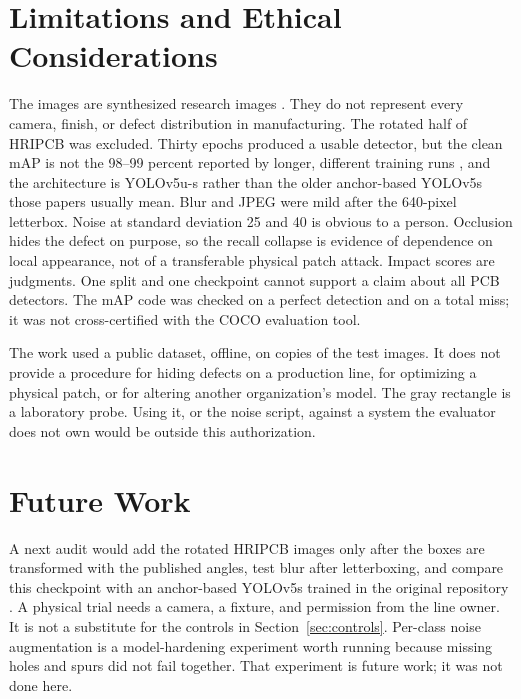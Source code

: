 \documentclass[conference]{IEEEtran}
\begin{document}
\section{Limitations and Ethical Considerations}
The images are synthesized research images \cite{huang2020hripcb}. They do not represent every camera, finish, or defect distribution in manufacturing. The rotated half of HRIPCB was excluded. Thirty epochs produced a usable detector, but the clean mAP is not the 98--99 percent reported by longer, different training runs \cite{niu2023yolov5,xiao2024cdiyolo}, and the architecture is YOLOv5u-s rather than the older anchor-based YOLOv5s those papers usually mean. Blur and JPEG were mild after the 640-pixel letterbox. Noise at standard deviation 25 and 40 is obvious to a person. Occlusion hides the defect on purpose, so the recall collapse is evidence of dependence on local appearance, not of a transferable physical patch attack. Impact scores are judgments. One split and one checkpoint cannot support a claim about all PCB detectors. The mAP code was checked on a perfect detection and on a total miss; it was not cross-certified with the COCO evaluation tool.

The work used a public dataset, offline, on copies of the test images. It does not provide a procedure for hiding defects on a production line, for optimizing a physical patch, or for altering another organization's model. The gray rectangle is a laboratory probe. Using it, or the noise script, against a system the evaluator does not own would be outside this authorization.

\section{Future Work}
A next audit would add the rotated HRIPCB images only after the boxes are transformed with the published angles, test blur after letterboxing, and compare this checkpoint with an anchor-based YOLOv5s trained in the original repository \cite{jocher2020yolov5}. A physical trial needs a camera, a fixture, and permission from the line owner. It is not a substitute for the controls in Section~\ref{sec:controls}. Per-class noise augmentation is a model-hardening experiment worth running because missing holes and spurs did not fail together. That experiment is future work; it was not done here.
\end{document}
